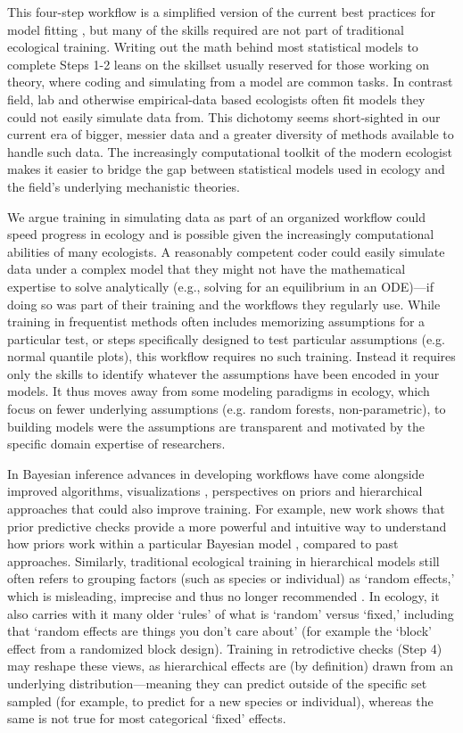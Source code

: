 \documentclass[11pt]{article}
\begin{document}
This four-step workflow is a simplified version of the current best practices for model fitting  \citep{betanworkflow,vandeschoot2021}, but many of the skills required are not part of traditional ecological training. Writing out the math behind most statistical models to complete Steps 1-2 leans on the skillset usually reserved for those working on theory, where coding and simulating from a model are common tasks. In contrast field, lab and otherwise empirical-data based ecologists often fit models they could not easily simulate data from. This dichotomy seems short-sighted in our current era of bigger, messier data and a greater diversity of methods available to handle such data. The increasingly computational toolkit of the modern ecologist makes it easier to bridge the gap between statistical models used in ecology and the field's underlying mechanistic theories.

We argue training in simulating data as part of an organized workflow could speed progress in ecology and is possible given the increasingly computational abilities of many ecologists. A reasonably competent coder could easily simulate data under a complex model that they might not have the mathematical expertise to solve analytically (e.g., solving for an equilibrium in an ODE)---if doing so was part of their training and the workflows they regularly use. While training in frequentist methods often includes memorizing assumptions for a particular test, or steps specifically designed to test particular assumptions (e.g. normal quantile plots), this workflow requires no such training. Instead it requires only the skills to identify whatever the assumptions have been encoded in your models. It thus moves away from some modeling paradigms in ecology, which focus on fewer underlying assumptions (e.g. random forests, non-parametric), to building models were the assumptions are transparent and motivated by the specific domain expertise of researchers. 

In Bayesian inference advances in developing workflows have come alongside improved algorithms, visualizations \citep[e.g.][]{betanworkflow,vandeschoot2021,gabryvis}, perspectives on priors \citep{BDA,regotherstories,betanprior}  and hierarchical approaches that could also improve training. 
For example, new work shows that prior predictive checks provide a more powerful and intuitive way to understand how priors work within a particular Bayesian model \citep{betanprior}, compared to past approaches. Similarly, traditional ecological training in hierarchical models still often refers to grouping factors (such as species or individual) as `random effects,' which is misleading, imprecise and thus no longer recommended \citep{gelmanhill}. In ecology, it also carries with it many older `rules' of what is `random' versus `fixed,' including that `random effects are things you don't care about' (for example the `block' effect from a randomized block design). Training in retrodictive checks (Step 4) may reshape these views, as hierarchical effects are (by definition) drawn from an underlying distribution---meaning they can predict outside of the specific set sampled (for example, to predict for a new species or individual), whereas the same is not true for most categorical `fixed' effects.
\end{document}
